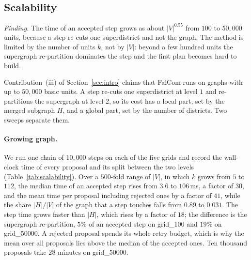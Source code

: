 \subsection{Scalability}\label{sec:exp-scalability}

\emph{Finding.} The time of an accepted step grows as about $|V|^{0.55}$ from $100$ to $50{,}000$ units, because a step re-cuts one superdistrict and not the graph. The method is limited by the number of units $k$, not by $|V|$: beyond a few hundred units the supergraph re-partition dominates the step and the first plan becomes hard to build.

Contribution~(iii) of Section~\ref{sec:intro} claims that FalCom runs on graphs with up to $50{,}000$ basic units. A step re-cuts one superdistrict at level $1$ and re-partitions the supergraph at level $2$, so its cost has a local part, set by the merged subgraph $H$, and a global part, set by the number of districts. Two sweeps separate them.

\paragraph{Growing graph.}
We run one chain of $10{,}000$ steps on each of the five grids and record the wall-clock time of every proposal and its split between the two levels (Table~\ref{tab:scalability}). Over a $500$-fold range of $|V|$, in which $k$ grows from $5$ to $112$, the median time of an accepted step rises from $3.6$ to $106$\,ms, a factor of $30$, and the mean time per proposal including rejected ones by a factor of $41$, while the share $|H|/|V|$ of the graph that a step touches falls from $0.89$ to $0.031$. The step time grows faster than $|H|$, which rises by a factor of $18$; the difference is the supergraph re-partition, $5\%$ of an accepted step on grid\_100 and $19\%$ on grid\_50000. A rejected proposal spends its whole retry budget, which is why the mean over all proposals lies above the median of the accepted ones. Ten thousand proposals take $28$ minutes on grid\_50000.

\begin{table}[!htbp]
\centering
\footnotesize\setlength{\tabcolsep}{4pt}
\resizebox{\linewidth}{!}{}
\caption{Per-step cost on the five grids, one chain of $10{,}000$ steps each. $|\Pc^1|$ is the median number of districts and $|H|$ the number of nodes of the superdistrict that a step re-cuts. The median and the $95$th percentile are over accepted steps; ``mean proposal'' includes rejected ones. ``Supergraph share'' is the share of the time of accepted steps spent re-partitioning the supergraph.}
\label{tab:scalability}
\end{table}

